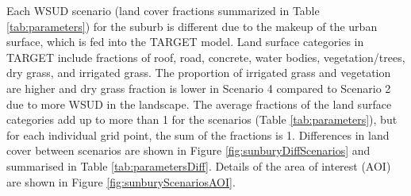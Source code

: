 \documentclass[final,3p,times,authoryear]{elsarticle}
\begin{document}
Each WSUD scenario (land cover fractions summarized in Table \ref{tab:parameters}) for the suburb is different due to the makeup of the urban surface, which is fed into the TARGET model. Land surface categories in TARGET include fractions of roof, road, concrete, water bodies, vegetation/trees, dry grass, and irrigated grass. The proportion of irrigated grass and vegetation are higher and dry grass fraction is lower in Scenario 4 compared to Scenario 2 due to more WSUD in the landscape. The average fractions of the land surface categories add up to more than 1 for the scenarios (Table \ref{tab:parameters}), but for each individual grid point, the sum of the fractions is 1. Differences in land cover between scenarios are shown in Figure  \ref{fig:sunburyDiffScenarios} and summarised in Table \ref{tab:parametersDiff}. Details of the area of interest (AOI) are shown in Figure  \ref{fig:sunburyScenariosAOI}.





	
\end{document}
